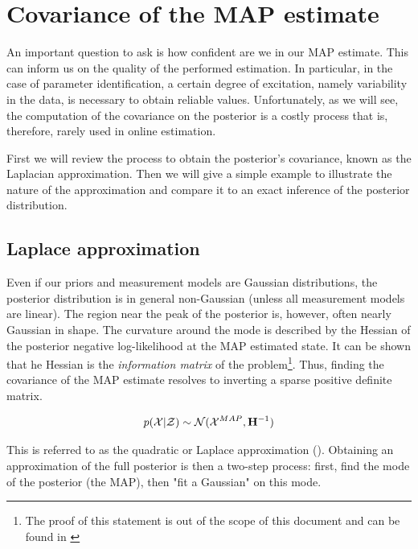 \appendix




\chapter{Covariance of the MAP estimate}
\label{chp:MAP_covariance}
An important question to ask is how confident are we in our MAP estimate.
This can inform us on the quality of the performed estimation. In particular, in the case of parameter identification, a certain degree of excitation,
namely variability in the data, is necessary to obtain reliable values. Unfortunately, as we will see, the computation of the covariance on the posterior
is a costly process that is, therefore, rarely used in online estimation.

First we will review the process to obtain the posterior's covariance, known as the Laplacian approximation. Then we will give a simple example to
illustrate the nature of the approximation and compare it to an exact inference of the posterior distribution.

\section{Laplace approximation}
\label{sec:map_covariance}
Even if our priors and measurement models are Gaussian distributions, the posterior distribution
is in general non-Gaussian (unless all measurement models are linear). The region near the peak of the posterior is, however, often nearly Gaussian in shape.
The curvature around the mode is described by the Hessian of the posterior negative log-likelihood at the MAP estimated state. 
It can be shown that he Hessian is the \textit{information matrix} of the problem\footnote{The proof of this statement is out of the scope of this document and can be found in
\cite[Section 5.1]{peng2018advanced}}. Thus, finding the covariance of the MAP estimate resolves to inverting a 
sparse positive definite matrix.

\begin{equation}
    p(\mathcal{X} | \mathcal{Z}) \sim \mathcal{N}({\mathcal{X}^{MAP}},{{\bf H}^{-1}})
    \label{eq:map_laplace}
\end{equation}

This is referred to as the quadratic or Laplace approximation (\cite[Section 2.4.2]{mcelreath2018statistical}). Obtaining an approximation of the full posterior is then a two-step process: 
first, find the mode of the posterior (the MAP), then "fit a Gaussian" on this mode. 

